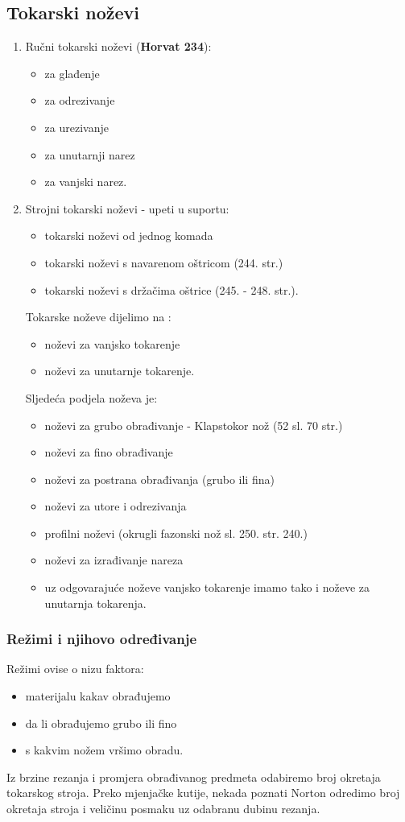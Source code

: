 \documentclass[a4paper,12pt]{article}
\numberwithin{figure}{section}
\begin{document}
\subsection{Tokarski noževi} 
\begin{enumerate}
\item Ručni tokarski noževi (\textbf{Horvat 234}):
\begin{itemize}
\item za glađenje
\item za odrezivanje
\item za urezivanje
\item za unutarnji narez
\item za vanjski narez.
\end{itemize}
\item Strojni tokarski noževi - upeti u suportu:
\begin{itemize}
\item tokarski noževi od jednog komada
\item tokarski noževi s navarenom oštricom (244. str.)
\item tokarski noževi s držačima oštrice (245. - 248. str.).
\end{itemize}
Tokarske noževe dijelimo na :
\begin{itemize}
\item noževi za vanjsko tokarenje
\item noževi za unutarnje tokarenje.
\end{itemize}
Sljedeća podjela noževa je:
\begin{itemize}
\item noževi za grubo obrađivanje - Klapstokor nož (52 sl. 70 str.)
\item noževi za fino obrađivanje
\item noževi za postrana obrađivanja (grubo ili fina)
\item noževi za utore i odrezivanja
\item profilni noževi (okrugli fazonski nož sl. 250. str. 240.)
\item noževi za izrađivanje nareza
\item uz odgovarajuće noževe vanjsko tokarenje imamo tako i noževe za unutarnja tokarenja.
\end{itemize}
\end{enumerate}
\subsubsection{Režimi i njihovo određivanje}
Režimi ovise o nizu faktora:
\begin{itemize}
\item materijalu kakav obrađujemo
\item da li obrađujemo grubo ili fino
\item s kakvim nožem vršimo obradu.
\end{itemize}
Iz brzine rezanja i promjera obrađivanog predmeta odabiremo broj okretaja tokarskog stroja. Preko mjenjačke kutije, nekada poznati Norton odredimo broj okretaja stroja i veličinu posmaku uz odabranu dubinu rezanja.
\end{document}
